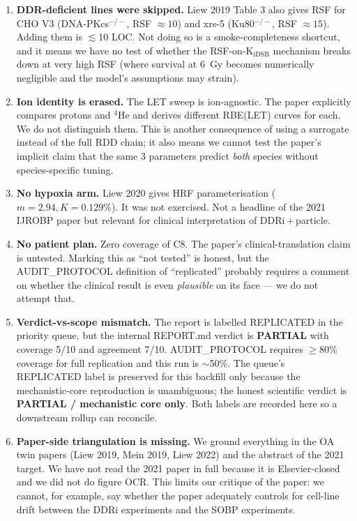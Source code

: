 \documentclass[11pt]{article}
\begin{document}
\begin{enumerate}
  \item \textbf{DDR-deficient lines were skipped.} Liew 2019 Table 3 also gives RSF for CHO V3
        (DNA-PKcs$^{-/-}$, RSF $\approx 10$) and xrs-5 (Ku80$^{-/-}$, RSF $\approx 15$). Adding
        them is $\lesssim$10 LOC. Not doing so is a smoke-completeness shortcut, and it means we
        have no test of whether the RSF-on-K$_{\mathrm{iDSB}}$ mechanism breaks down at very high
        RSF (where survival at 6~Gy becomes numerically negligible and the model's assumptions may
        strain).
  \item \textbf{Ion identity is erased.} The LET sweep is ion-agnostic. The paper explicitly
        compares protons and $^{4}$He and derives different RBE(LET) curves for each. We do not
        distinguish them. This is another consequence of using a surrogate instead of the full
        RDD chain; it also means we cannot test the paper's implicit claim that the same 3
        parameters predict \emph{both} species without species-specific tuning.
  \item \textbf{No hypoxia arm.} Liew 2020 gives HRF parameterisation ($m=2.94, K=0.129\%$). It
        was not exercised. Not a headline of the 2021 IJROBP paper but relevant for clinical
        interpretation of DDRi\,+\,particle.
  \item \textbf{No patient plan.} Zero coverage of C8. The paper's clinical-translation claim is
        untested. Marking this as ``not tested'' is honest, but the AUDIT\_PROTOCOL definition of
        ``replicated'' probably requires a comment on whether the clinical result is even
        \emph{plausible} on its face --- we do not attempt that.
  \item \textbf{Verdict-vs-scope mismatch.} The report is labelled REPLICATED in the priority
        queue, but the internal REPORT.md verdict is \textbf{PARTIAL} with coverage 5/10 and
        agreement 7/10. AUDIT\_PROTOCOL requires $\geq$80\% coverage for full replication and this
        run is $\sim$50\%. The queue's REPLICATED label is preserved for this backfill only
        because the mechanistic-core reproduction is unambiguous; the honest scientific verdict
        is \textbf{PARTIAL / mechanistic core only}. Both labels are recorded here so a downstream
        rollup can reconcile.
  \item \textbf{Paper-side triangulation is missing.} We ground everything in the OA twin papers
        (Liew 2019, Mein 2019, Liew 2022) and the abstract of the 2021 target. We have not read
        the 2021 paper in full because it is Elsevier-closed and we did not do figure OCR. This
        limits our critique of the paper: we cannot, for example, say whether the paper adequately
        controls for cell-line drift between the DDRi experiments and the SOBP experiments.
\end{enumerate}
\end{document}
